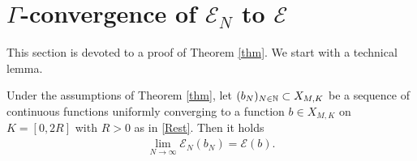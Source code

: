 
\section{$\Gamma$-convergence of $\mathcal E_N$ to $\mathcal E$}


This section is devoted to a proof of Theorem \ref{thm}.
We start with a technical lemma.

\begin{lemma}\label{lemma-semicontinuous-1}
	Under the assumptions of Theorem \ref{thm}, let $(b_N)_{N \in \mathbb{N}}\subset X_{M,K}$ be a sequence of continuous functions uniformly converging to a function $b \in X_{M,K}$ on $K=[0,2R]$  with $R>0$ as in \eqref{Rest}. %
Then it holds
	\begin{align*}
		\lim_{N\rightarrow\infty} \mathcal E_{N}(b_{N})= \mathcal E(b).
	\end{align*}
\end{lemma}

